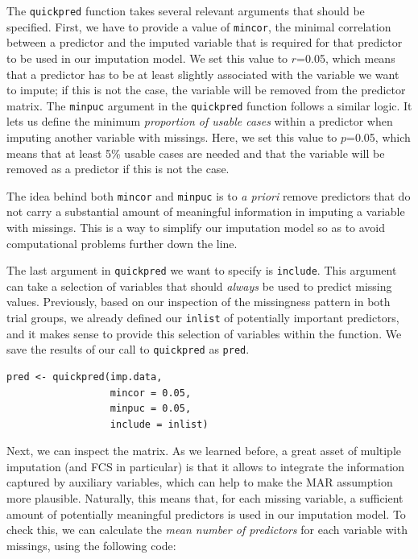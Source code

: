 The \texttt{quickpred} function takes several relevant arguments that should be specified. First, we have to provide a value of \texttt{mincor}, the minimal correlation between a predictor and the imputed variable that is required for that predictor to be used in our imputation model. We set this value to $r$=0.05, which means that a predictor has to be at least slightly associated with the variable we want to impute; if this is not the case, the variable will be removed from the predictor matrix. The \texttt{minpuc} argument in the \texttt{quickpred} function follows a similar logic. It lets us define the minimum \emph{proportion of usable cases} within a predictor when imputing another variable with missings. Here, we set this value to $p$=0.05, which means that at least 5\% usable cases are needed and that the variable will be removed as a predictor if this is not the case. 

The idea behind both \texttt{mincor} and \texttt{minpuc} is to \emph{a priori} remove predictors that do not carry a substantial amount of meaningful information in imputing a variable with missings. This is a way to simplify our imputation model so as to avoid computational problems further down the line.

The last argument in \texttt{quickpred} we want to specify is \texttt{include}. This argument can take a selection of variables that should \emph{always} be used to predict missing values. Previously, based on our inspection of the missingness pattern in both trial groups, we already defined our \texttt{inlist} of potentially important predictors, and it makes sense to provide this selection of variables within the function. We save the results of our call to \texttt{quickpred} as \texttt{pred}. 

\begin{lstlisting}
pred <- quickpred(imp.data,
                  mincor = 0.05,
                  minpuc = 0.05,
                  include = inlist)
\end{lstlisting}

Next, we can inspect the matrix. As we learned before, a great asset of multiple imputation (and FCS in particular) is that it allows to integrate the information captured by auxiliary variables, which can help to make the MAR assumption more plausible. Naturally, this means that, for each missing variable, a sufficient amount of potentially meaningful predictors is used in our imputation model. To check this, we can calculate the \emph{mean number of predictors} for each variable with missings, using the following code:

